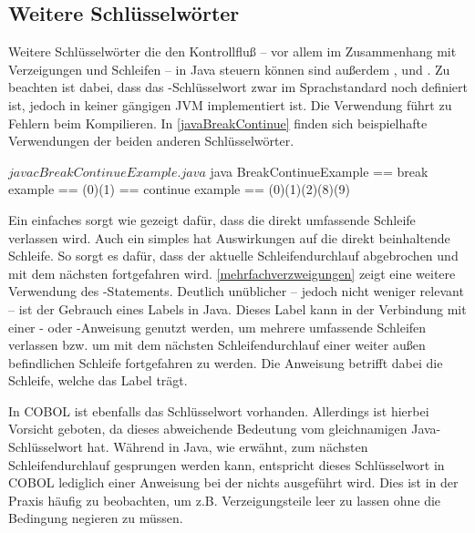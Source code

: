 
\subsection{Weitere Schlüsselwörter}

Weitere Schlüsselwörter die den Kontrollfluß -- vor allem im Zusammenhang mit Verzeigungen und Schleifen -- in Java steuern können sind außerdem ,  und . Zu beachten ist dabei, dass das -Schlüsselwort zwar im Sprachstandard noch definiert ist, jedoch in keiner gängigen JVM implementiert ist. Die Verwendung führt zu Fehlern beim Kompilieren. In \autoref{javaBreakContinue} finden sich beispielhafte Verwendungen der beiden anderen Schlüsselwörter.

\sepCodeAndOutputCheck
\begin{shellwindow}
$ javac BreakContinueExample.java 
$ java BreakContinueExample
== break example == 
(0)(1)
== continue example == 
(0)(1)(2)(8)(9)
\end{shellwindow}

Ein einfaches  sorgt wie gezeigt dafür, dass die direkt umfassende Schleife verlassen wird. Auch ein simples  hat Auswirkungen auf die direkt beinhaltende Schleife. So sorgt es dafür, dass der aktuelle Schleifendurchlauf abgebrochen und mit dem nächsten fortgefahren wird. \autoref{mehrfachverzweigungen} zeigt eine weitere Verwendung des -Statements. Deutlich unüblicher -- jedoch nicht weniger relevant -- ist der Gebrauch eines Labels in Java. Dieses Label kann in der Verbindung mit einer - oder -Anweisung genutzt werden, um mehrere umfassende Schleifen verlassen bzw. um mit dem nächsten Schleifendurchlauf einer weiter außen befindlichen Schleife fortgefahren zu werden. Die Anweisung betrifft dabei die Schleife, welche das Label trägt. 

In COBOL ist ebenfalls das Schlüsselwort  vorhanden. Allerdings ist hierbei Vorsicht geboten, da dieses abweichende Bedeutung vom gleichnamigen Java-Schlüsselwort hat. Während in Java, wie erwähnt, zum nächsten Schleifendurchlauf gesprungen werden kann, entspricht dieses Schlüsselwort in COBOL lediglich einer Anweisung bei der nichts ausgeführt wird. Dies ist in der Praxis häufig zu beobachten, um z.B. Verzeigungsteile leer zu lassen ohne die Bedingung negieren zu müssen.

